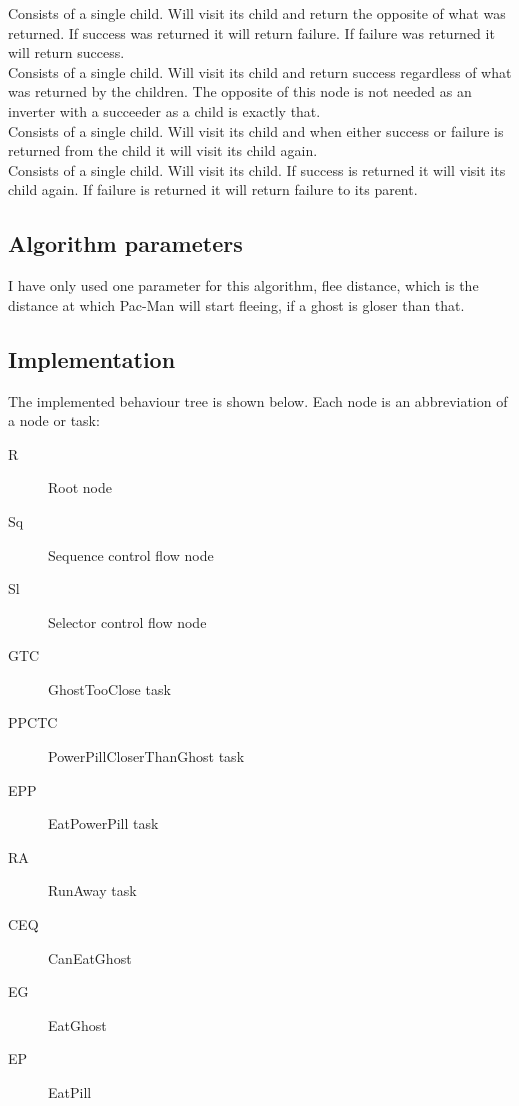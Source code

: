 Consists of a single child. Will visit its child and return the opposite of what was returned. If success was returned it will return failure. If failure was returned it will return success. \\

Consists of a single child. Will visit its child and return success regardless of what was returned by the children. The opposite of this node is not needed as an inverter with a succeeder as a child is exactly that. \\

Consists of a single child. Will visit its child and when either success or failure is returned from the child it will visit its child again. \\

Consists of a single child. Will visit its child. If success is returned it will visit its child again. If failure is returned it will return failure to its parent.

\subsection{Algorithm parameters}
I have only used one parameter for this algorithm, flee distance, which is the distance at which Pac-Man will start fleeing, if a ghost is gloser than that.

\subsection{Implementation}
The implemented behaviour tree is shown below. Each node is an abbreviation of a node or task:

\begin{description}
	\item[R] Root node
	\item[Sq] Sequence control flow node
	\item[Sl] Selector control flow node
	\item[GTC] GhostTooClose task
	\item[PPCTC] PowerPillCloserThanGhost task
	\item[EPP] EatPowerPill task
	\item[RA] RunAway task
	\item[CEQ] CanEatGhost
	\item[EG] EatGhost
	\item[EP] EatPill
\end{description}


